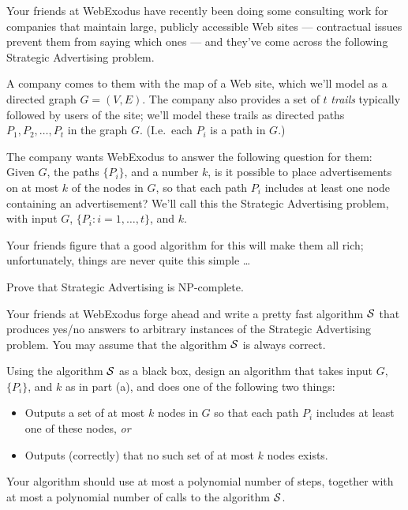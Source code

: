 \documentclass[11pt]{article}
\theoremstyle{numberplain}
\theoremstyle{nonumberplain}
\newcommand{\0}{{\mathbf{0}}}
\begin{document}
\begin{ques}[8-10] 
Your friends at WebExodus have recently been 
doing some consulting work for companies that
maintain large, publicly accessible Web sites ---
contractual issues prevent them from saying which ones ---
and they've come across the following
{\sc Strategic Advertising} problem.

A company comes to them with the map of a Web site,
which we'll model as a directed graph $G = (V,E)$.
The company also provides a set of $t$ {\em trails}
typically followed by users of the site;
we'll model these trails as directed paths
$P_1, P_2, \ldots, P_t$ in the graph $G$.
(I.e.~each $P_i$ is a path in $G$.)

The company wants WebExodus to answer the following question
for them: Given $G$, the paths $\{P_i\}$, and a number $k$, is
it possible to place advertisements on at most $k$ of the nodes in $G$,
so that each path $P_i$ includes at least one node containing
an advertisement?
We'll call this the {\sc Strategic Advertising} problem,
with input $G$, $\{P_i : i = 1, \ldots, t\}$, and $k$.

Your friends figure that a good algorithm for this will
make them all rich; unfortunately, things are never quite this simple \ldots\

Prove that {\sc Strategic Advertising} is NP-complete.

Your friends at WebExodus forge ahead and write
a pretty fast algorithm $\cal S$ that produces
yes/no answers to arbitrary instances of the
{\sc Strategic Advertising} problem.
You may assume that the algorithm $\cal S$ is always correct.

Using the algorithm $\cal S$ as a black box,
design an algorithm that takes input $G$, $\{P_i\}$, and $k$
as in part (a), and does one of the following two things:
\begin{itemize}
\item Outputs a set of at most $k$ nodes in $G$ so that each path $P_i$
includes at least one of these nodes, {\em or}
\item Outputs (correctly) that no such set of at most $k$ nodes exists.
\end{itemize}
Your algorithm should use at most a polynomial number of steps, together
with at most a polynomial number of calls to the algorithm $\cal S$.
\end{ques}
\end{document}
